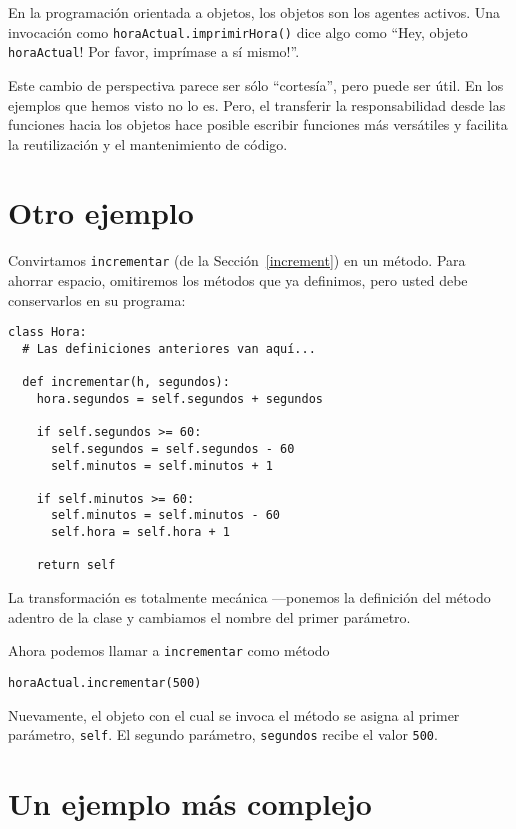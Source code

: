 En la programación orientada a objetos, los objetos son 
los agentes activos. Una invocación como \texttt{horaActual.imprimirHora()} 
dice algo como  ``Hey, objeto \texttt{horaActual}!  Por favor, imprímase a 
sí mismo!''.

Este cambio de perspectiva parece ser sólo ``cortesía'', pero puede
ser útil. En los ejemplos que hemos visto no lo es. Pero, el 
transferir la responsabilidad desde las funciones hacia los
objetos hace posible escribir funciones más versátiles y 
facilita la reutilización y el mantenimiento de código.


\section{Otro ejemplo}

Convirtamos  \texttt{incrementar} (de la Sección~\ref{increment}) en un método. Para ahorrar
espacio, omitiremos los métodos que ya definimos, pero 
usted debe conservarlos en su programa:


\beforeverb
\begin{verbatim}
class Hora:
  # Las definiciones anteriores van aquí...
  
  def incrementar(h, segundos):
    hora.segundos = self.segundos + segundos

    if self.segundos >= 60:
      self.segundos = self.segundos - 60
      self.minutos = self.minutos + 1

    if self.minutos >= 60:
      self.minutos = self.minutos - 60
      self.hora = self.hora + 1

    return self

\end{verbatim}
\afterverb
%
La transformación es totalmente mecánica ---ponemos la definición 
del método adentro de la clase y cambiamos el nombre del primer
parámetro.

Ahora podemos llamar a  \texttt{incrementar} como método

\beforeverb
\begin{verbatim}
horaActual.incrementar(500)
\end{verbatim}
\afterverb
%
Nuevamente, el objeto con el cual se invoca el método se asigna
al primer parámetro, \texttt{self}. El segundo parámetro, 
\texttt{segundos} recibe el valor \texttt{500}.

\section{Un ejemplo más complejo}

